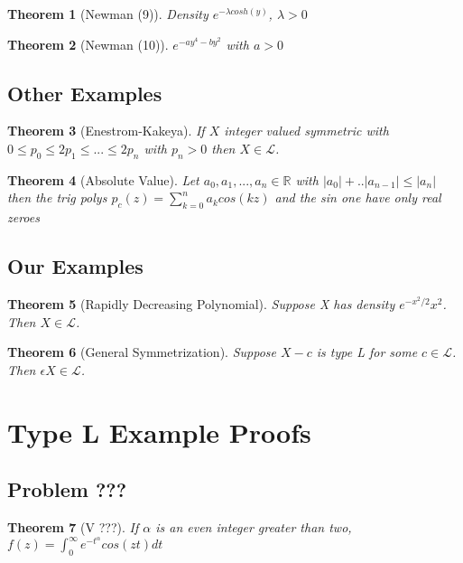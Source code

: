 \documentclass[10pt]{article}
\newcommand{\1}{\textbf{1}}
\newcommand{\R}{\mathbb{R}}
\newcommand{\lL}{\mathcal{L}}
\newtheorem{theorem}{Theorem}
\theoremstyle{remark}
\theoremstyle{definition}
\begin{document}
\begin{theorem}[Newman (9)] \label{N9}
	Density $e^{-\lambda cosh(y)}$, $\lambda >0$
\end{theorem}

\begin{theorem}[Newman (10)] \label{N10}
	$e^{-ay^4-by^2}$ with $a>0$
\end{theorem}

\subsection{Other Examples}

\begin{theorem}[Enestrom-Kakeya] \label{them:EK}
	If $X$ integer valued symmetric with $0\leq p_0 \leq 2 p_1 \leq ... \leq 2p_n$ with $p_n >0$ then $X \in \lL$.
\end{theorem}

\begin{theorem}[Absolute Value] \label{them:ABS}
	Let $a_0,a_1,...,a_n \in \R$ with $|a_0| + .. | a_{n-1}| \leq |a_n|$ then the trig polys $p_c(z) = \sum_{k=0}^n a_k cos(kz)$ and the sin one have only real zeroes
\end{theorem}

\subsection{Our Examples}

\begin{theorem}[Rapidly Decreasing Polynomial] \label{RDP}
	Suppose X has density $e^{-x^2/2}x^2$. Then $X \in \lL$.
\end{theorem}

\begin{theorem}[General Symmetrization] \label{GSYM}
	Suppose $X -c$ is type L for some $c \in \lL$. Then $\epsilon X \in \lL$.
\end{theorem}


\section{Type L Example Proofs}

\subsection{Problem ???}

\begin{theorem}[V ???]
	If $\alpha$ is an even integer greater than two, $f(z) = \int_0^{\infty} e^{-t^{\alpha}}cos(zt)dt$
\end{theorem}
\end{document}
